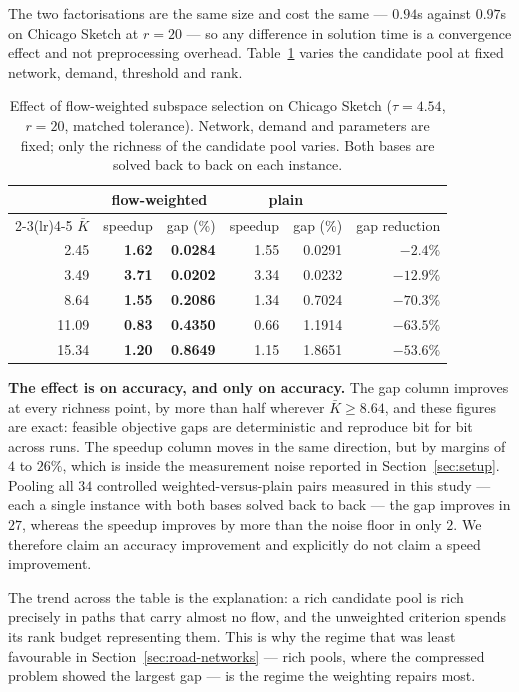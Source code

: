 \documentclass[11pt]{article}
\begin{document}
The two factorisations are the same size and cost the same --- $0.94$s against $0.97$s on
Chicago Sketch at $r=20$ --- so any difference in solution time is a convergence effect and not
preprocessing overhead. Table~\ref{tab:weighted-basis} varies the candidate pool at fixed
network, demand, threshold and rank.

\begin{table}[h]
\centering
\caption{Effect of flow-weighted subspace selection on Chicago Sketch ($\tau=4.54$, $r=20$,
matched tolerance). Network, demand and parameters are fixed; only the richness of the
candidate pool varies. Both bases are solved back to back on each instance.}
\label{tab:weighted-basis}
{\small
\begin{tabular}{rrrrrr}
\toprule
& \multicolumn{2}{c}{flow-weighted} & \multicolumn{2}{c}{plain} & \\
\cmidrule(lr){2-3}\cmidrule(lr){4-5}
$\bar K$ & speedup & gap (\%) & speedup & gap (\%) & gap reduction\\
\midrule
2.45  & \textbf{1.62} & \textbf{0.0284} & 1.55 & 0.0291 & $-2.4\%$\\
3.49  & \textbf{3.71} & \textbf{0.0202} & 3.34 & 0.0232 & $-12.9\%$\\
8.64  & \textbf{1.55} & \textbf{0.2086} & 1.34 & 0.7024 & $\mathbf{-70.3\%}$\\
11.09 & \textbf{0.83} & \textbf{0.4350} & 0.66 & 1.1914 & $\mathbf{-63.5\%}$\\
15.34 & \textbf{1.20} & \textbf{0.8649} & 1.15 & 1.8651 & $\mathbf{-53.6\%}$\\
\bottomrule
\end{tabular}}
\end{table}

\textbf{The effect is on accuracy, and only on accuracy.} The gap column improves at every
richness point, by more than half wherever $\bar K \ge 8.64$, and these figures are exact:
feasible objective gaps are deterministic and reproduce bit for bit across runs. The speedup
column moves in the same direction, but by margins of $4$ to $26\%$, which is inside the
measurement noise reported in Section~\ref{sec:setup}. Pooling all $34$ controlled
weighted-versus-plain pairs measured in this study --- each a single instance with both bases
solved back to back --- the gap improves in $27$, whereas the speedup improves by more than the
noise floor in only $2$. We therefore claim an accuracy improvement and explicitly do not claim
a speed improvement.

The trend across the table is the explanation: a rich candidate pool is rich precisely in paths
that carry almost no flow, and the unweighted criterion spends its rank budget representing
them. This is why the regime that was least favourable in Section~\ref{sec:road-networks} ---
rich pools, where the compressed problem showed the largest gap --- is the regime the weighting
repairs most.
\end{document}

